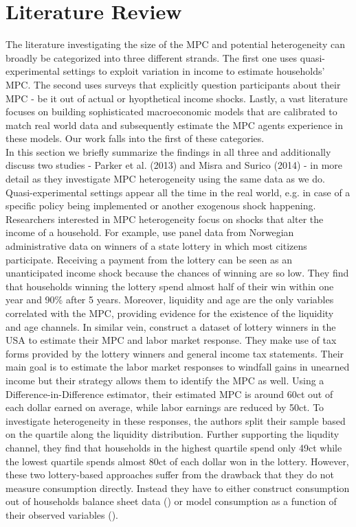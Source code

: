 \section{Literature Review} \label{sec:lit}
The literature investigating the size of the MPC and potential heterogeneity can broadly be categorized into three different strands. The first one uses quasi-experimental settings to exploit variation in income to estimate households' MPC. The second uses surveys that explicitly question participants about their MPC - be it out of actual or hyopthetical income shocks. Lastly, a vast literature focuses on building sophisticated macroeconomic models that are calibrated to match real world data and subsequently estimate the MPC agents experience in these models. Our work falls into the first of these categories.\\
In this section we briefly summarize the findings in all three and additionally discuss two studies - Parker et al. (2013) and Misra and Surico (2014) - in more detail as they investigate MPC heterogeneity using the same data as we do. \\
Quasi-experimental settings appear all the time in the real world, e.g. in case of a specific policy being implemented or another exogenous shock happening. Researchers interested in MPC heterogeneity focus on shocks that alter the income of a household. For example, \cite{fagereng_etal} use panel data from Norwegian administrative data on winners of a state lottery in which most citizens participate. Receiving a payment from the lottery can be seen as an unanticipated income shock because the chances of winning are so low. They find that households winning the lottery spend almost half of their win within one year and 90\% after 5 years. Moreover, liquidity and age are the only variables correlated with the MPC, providing evidence for the existence of the liquidity and age channels. In similar vein, \cite{golosov_etal} construct a dataset of lottery winners in the USA to estimate their MPC and labor market response. They make use of tax forms provided by the lottery winners and general income tax statements. Their main goal is to estimate the labor market responses to windfall gains in unearned income but their strategy allows them to identify the MPC as well. Using a Difference-in-Difference estimator, their estimated MPC is around 60ct out of each dollar earned on average, while labor earnings are reduced by 50ct. To investigate heterogeneity in these responses, the authors split their sample based on the quartile along the liquidity distribution. Further supporting the liqudity channel, they find that households in the highest quartile spend only 49ct while the lowest quartile spends almost 80ct of each dollar won in the lottery. However, these two lottery-based approaches suffer from the drawback that they do not measure consumption directly. Instead they have to either construct consumption out of households balance sheet data (\cite{fagereng_etal}) or model consumption as a function of their observed variables (\cite{golosov_etal}). 

